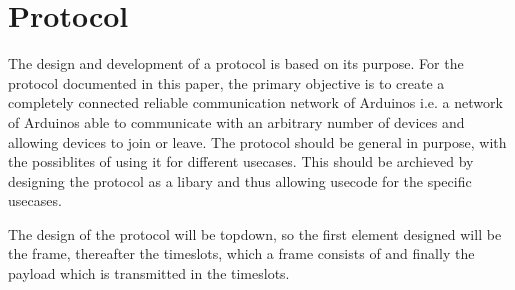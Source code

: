 \section{Protocol}
The design and development of a protocol is based on its purpose.
For the protocol documented in this paper, the primary objective is to create a completely connected reliable communication network of Arduinos i.e. a network of Arduinos able to communicate with an arbitrary number of devices and allowing devices to join or leave.
The protocol should be general in purpose, with the possiblites of using it for different usecases.
This should be archieved by designing the protocol as a libary and thus allowing usecode for the specific usecases.

The design of the protocol will be topdown, so the first element designed will be the frame, thereafter the timeslots, which a frame consists of and finally the payload which is transmitted in the timeslots. 